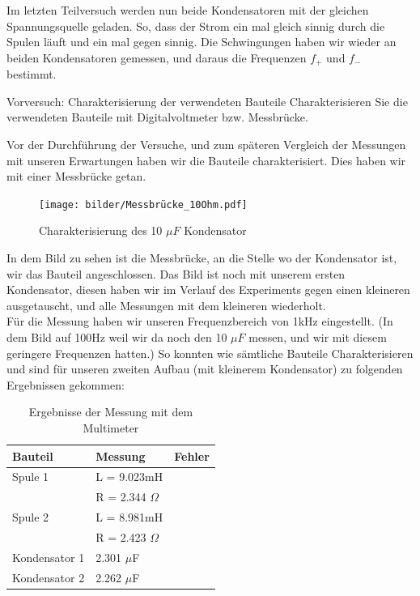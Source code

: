 \documentclass[twoside]{protokoll}
\begin{document}
Im letzten Teilversuch werden nun beide Kondensatoren mit der gleichen Spannungsquelle geladen. 
So, dass der Strom ein mal gleich sinnig durch die Spulen läuft und ein mal gegen sinnig. Die Schwingungen haben wir wieder an beiden Kondensatoren gemessen, und daraus die Frequenzen $f_+$ und $f_-$ bestimmt. 
 

\begin{aufgabe}{Vorversuch: Charakterisierung der verwendeten Bauteile}
  Charakterisieren Sie die verwendeten Bauteile mit Digitalvoltmeter
  bzw. Messbrücke.
\end{aufgabe}

Vor der Durchführung der Versuche, und zum späteren Vergleich der Messungen mit unseren Erwartungen haben wir die Bauteile charakterisiert. Dies haben wir mit einer Messbrücke getan. 

\begin{figure}[H]
    \centering
    \texttt{[image: bilder/Messbrücke\_10Ohm.pdf]}
    \caption{Charakterisierung des 10 $\mu F$ Kondensator}
\end{figure}

In dem Bild zu sehen ist die Messbrücke, an die Stelle wo der Kondensator ist, wir das Bauteil angeschlossen. Das Bild ist noch mit unserem ersten Kondensator, diesen haben wir im Verlauf des Experiments gegen einen kleineren ausgetauscht, und alle Messungen mit dem kleineren wiederholt.\\

Für die Messung haben wir unseren Frequenzbereich von 1kHz eingestellt.
 (In dem Bild auf 100Hz weil wir da noch den 10 $\mu F$ messen, und wir mit diesem geringere Frequenzen hatten.) 
So konnten wie sämtliche Bauteile Charakterisieren und sind für unseren zweiten Aufbau (mit kleinerem Kondensator) zu folgenden Ergebnissen gekommen:\\
    
\begin{table}[h]
        \centering
        \begin{tabularx}{0.8\textwidth}{X X c} %
            \toprule
            \textbf{Bauteil} & \textbf{Messung} & \textbf{Fehler} \\
            \midrule
            Spule 1 & L = 9.023mH &  \\
            & R = 2.344 $\Omega$ & \\
            Spule 2 & L = 8.981mH &  \\
            & R = 2.423 $\Omega$ \\
            Kondensator 1 & 2.301 $\mu$F &  \\
            Kondensator 2 & 2.262 $\mu$F &  \\
            \bottomrule
        \end{tabularx}
        \caption{Ergebnisse der Messung mit dem Multimeter}
        \label{tab:mytable}
    \end{table}
\end{document}
